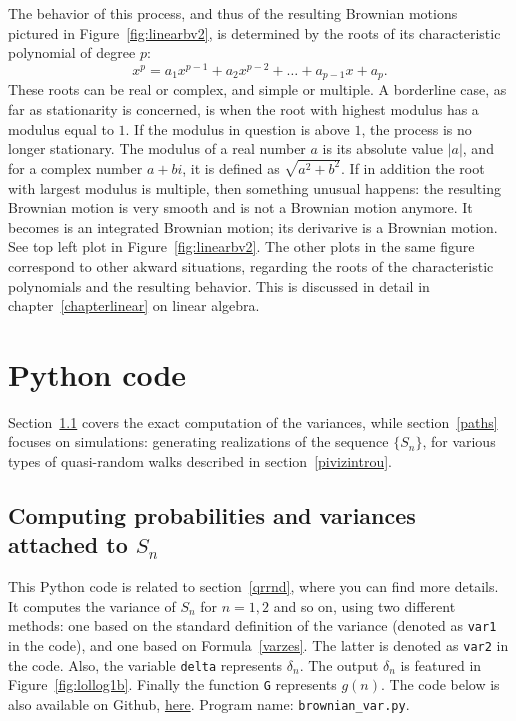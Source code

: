 \documentclass[oneside,10pt]{book}
\renewcommand{\arraystretch}{1.4} %
\begin{document}
The behavior of this process, and thus of the resulting Brownian motions pictured in Figure~\ref{fig:linearbv2}, is determined by the roots of
 its  \textcolor{index}{characteristic polynomial} of degree $p$:
$$
x^p=a_1 x^{p-1}+a_2 x^{p-2}+\dots + a_{p-1}x+ a_p.
$$
These roots can be real or complex, and simple or multiple. A borderline case, as far as stationarity is concerned, is when the root with highest modulus    
 has  a \textcolor{index}{modulus} equal to $1$. If the modulus in question is above $1$, the process is no longer stationary. The modulus
 of a real number $a$ is its absolute value $|a|$, and for a complex number $a+bi$, it is defined as $\sqrt{a^2+b^2}$. If in addition the root 
 with largest modulus is 
 multiple, then something unusual happens: the resulting Brownian motion is very smooth and is not a Brownian motion anymore. 
  It becomes is an integrated Brownian motion; its derivarive is a Brownian motion.  See top left plot in Figure~\ref{fig:linearbv2}. The other plots in the same figure correspond to other akward situations, regarding the roots of the characteristic polynomials and the resulting behavior. This is discussed in detail in chapter~\ref{chapterlinear} on linear algebra.




\renewcommand{\arraystretch}{1.0} %
\renewcommand{\arraystretch}{1.4} %

\section{Python code}\label{pythonviz}

Section~\ref{pypy1bv} covers the exact computation of the variances, while section~\ref{paths} focuses on simulations: generating realizations of 
 the sequence $\{S_n\}$, for various types of quasi-random walks described in section~\ref{pivizintrou}.


\subsection{Computing probabilities and variances attached to $S_n$}\label{pypy1bv}

This Python code is related to section~\ref{qrrnd}, where you can find more details.
It computes the variance of $S_n$ for $n=1, 2$ and so on, using two different methods:
 one based on the standard definition of the variance (denoted as \texttt{var1} in the code), and one based 
 on Formula~\ref{varzes}. The latter is denoted as \texttt{var2} in the code.  Also, the variable \texttt{delta}
 represents $\delta_n$. The output $\delta_n$ is featured in Figure~\ref{fig:lollog1b}.  Finally the function \texttt{G} represents $g(n)$. 
The code below is also available on Github, \href{https://github.com/VincentGranville/Machine-Learning/blob/main/Source\%20Code/brownian_var.py}{here}. 
Program name: \texttt{brownian\_var.py}. \\
\end{document}
